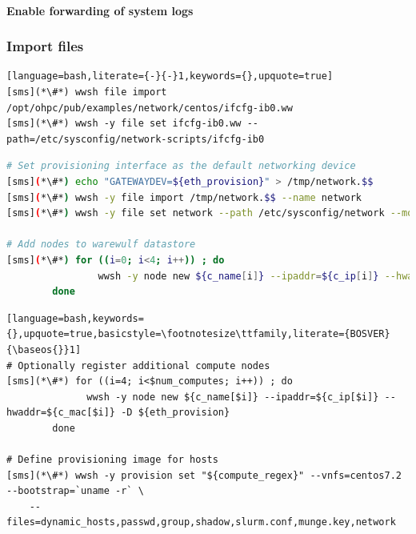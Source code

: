 \documentclass[letterpaper]{article}
\newcommand{\baseos}{centos7.2}
\begin{document}
\paragraph{Enable forwarding of system logs} \label{sec:add_syslog}



\subsubsection{Import files} \label{sec:file_import}



\begin{lstlisting}[language=bash,literate={-}{-}1,keywords={},upquote=true]
[sms](*\#*) wwsh file import /opt/ohpc/pub/examples/network/centos/ifcfg-ib0.ww
[sms](*\#*) wwsh -y file set ifcfg-ib0.ww --path=/etc/sysconfig/network-scripts/ifcfg-ib0
\end{lstlisting}




\begin{lstlisting}[language=bash,keywords={},upquote=true,basicstyle=\footnotesize\ttfamily,]
# Set provisioning interface as the default networking device
[sms](*\#*) echo "GATEWAYDEV=${eth_provision}" > /tmp/network.$$
[sms](*\#*) wwsh -y file import /tmp/network.$$ --name network
[sms](*\#*) wwsh -y file set network --path /etc/sysconfig/network --mode=0644 --uid=0

# Add nodes to warewulf datastore
[sms](*\#*) for ((i=0; i<4; i++)) ; do
                wwsh -y node new ${c_name[i]} --ipaddr=${c_ip[i]} --hwaddr=${c_mac[i]} -D ${eth_provision}
        done
\end{lstlisting}




\begin{lstlisting}[language=bash,keywords={},upquote=true,basicstyle=\footnotesize\ttfamily,literate={BOSVER}{\baseos{}}1]
# Optionally register additional compute nodes
[sms](*\#*) for ((i=4; i<$num_computes; i++)) ; do
              wwsh -y node new ${c_name[$i]} --ipaddr=${c_ip[$i]} --hwaddr=${c_mac[$i]} -D ${eth_provision}
        done

# Define provisioning image for hosts
[sms](*\#*) wwsh -y provision set "${compute_regex}" --vnfs=centos7.2 --bootstrap=`uname -r` \
    --files=dynamic_hosts,passwd,group,shadow,slurm.conf,munge.key,network 
\end{lstlisting}
\end{document}
